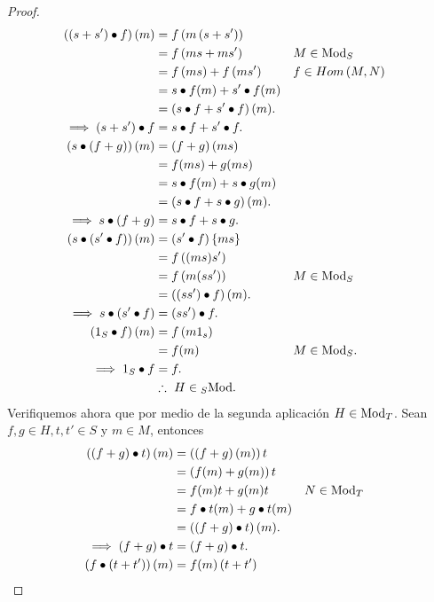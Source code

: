 \documentclass{article}
\newcommand{\lrprth}[1]{
	\left(#1\right)
}
\newcommand{\lrbrack}[1]{
	\left\{#1\right\}
}
\newcommand{\ringmod}[3]{
	\if#3l
	{}_{#1}#2
	\else
	\if#3r
	#2_{#1}
	\fi
	\fi
}
\theoremstyle{definition}
\theoremstyle{plain}
\theoremstyle{plain}
\theoremstyle{definition}
\theoremstyle{definition}
\theoremstyle{definition}
\theoremstyle{definition}
\theoremstyle{definition}
\theoremstyle{definition}
\begin{document}
\begin{enumerate}[label=\textbf{Ej \arabic*.}]
\begin{proof}
\begin{align*}
		\lrprth{\lrprth{s+s'}\bullet f}(m)&=f\lrprth{m\lrprth{s+s'}}\\
		&=f\lrprth{ms+ms'} && M\in\ringmod{S}{\text{Mod}}{r}\\
		&=f\lrprth{ms}+f\lrprth{ms'} && f\in Hom\lrprth{M,N}\\
		&=s\bullet f (m)+s'\bullet f (m)\\
		&=\lrprth{s\bullet f+ s'\bullet f}(m).\\
		\implies \lrprth{s+s'}\bullet f&= s\bullet f+ s'\bullet f.\\
		\lrprth{s\bullet\lrprth{f+g}}(m)&=\lrprth{f+g}\lrprth{ms}\\
		&=f(ms)+g(ms)\\
		&=s\bullet f (m)+ s\bullet g (m)\\
		&=\lrprth{s\bullet f+ s\bullet g }(m).\\
		\implies s\bullet\lrprth{f+g}&= s\bullet f+ s\bullet g.\\
		\lrprth{s\bullet\lrprth{s'\bullet f}}(m)&=\lrprth{s'\bullet f}\lrbrack{ms}\\
		&=f\lrprth{(ms)s'}\\
		&=f\lrprth{m(ss')} && M\in\ringmod{S}{\text{Mod}}{r}\\
		&=\lrprth{\lrprth{ss'}\bullet f}(m).\\
		\implies s\bullet\lrprth{s'\bullet f}&= \lrprth{ss'}\bullet f.\\
		\lrprth{1_S\bullet f}(m)&=f\lrprth{m1_s}\\
		&=f(m) && M\in\ringmod{S}{\text{Mod}}{r}.\\
		\implies 1_S\bullet f&= f.\\
		&\therefore\ H\in\ringmod{S}{\text{Mod}}{l}.
	\end{align*} 
	Verifiquemos ahora que por medio de la segunda aplicación $H\in\ringmod{T}{\text{Mod}}{r}$. Sean $f,g\in H, t,t'\in S$ y $m\in M$, entonces
	\begin{align*}
		\lrprth{\lrprth{f+g}\bullet t}(m)&=\lrprth{\lrprth{f+g}(m)}t\\
		&=\lrprth{f(m)+g(m)}t\\
		&=f(m)t+g(m)t && N\in\ringmod{T}{\text{Mod}}{r}\\
		&=f\bullet t(m)+g\bullet t(m)\\
		&=\lrprth{\lrprth{f+g}\bullet t}(m).\\
		\implies \lrprth{f+g}\bullet t&= \lrprth{f+g}\bullet t.\\
		\lrprth{f\bullet\lrprth{t+t'}}(m)&=f(m)\lrprth{t+t'}\\

\end{align*}
\end{proof}
\end{enumerate}
\end{document}
